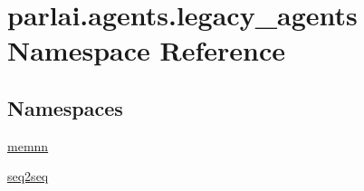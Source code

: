 \hypertarget{namespaceparlai_1_1agents_1_1legacy__agents}{}\section{parlai.\+agents.\+legacy\+\_\+agents Namespace Reference}
\label{namespaceparlai_1_1agents_1_1legacy__agents}
\subsection*{Namespaces}
\begin{DoxyCompactItemize}
\item 
 \hyperlink{namespaceparlai_1_1agents_1_1legacy__agents_1_1memnn}{memnn}
\item 
 \hyperlink{namespaceparlai_1_1agents_1_1legacy__agents_1_1seq2seq}{seq2seq}
\end{DoxyCompactItemize}
